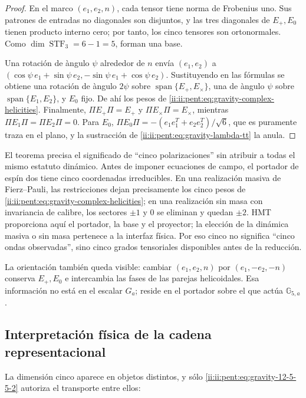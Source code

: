 \begin{proof}
En el marco \((e_1,e_2,n)\), cada tensor tiene norma de Frobenius uno.
Sus patrones de entradas no diagonales son disjuntos, y las tres diagonales
de \(E_+,E_0\) tienen producto interno cero; por tanto, los cinco tensores
son ortonormales. Como \(\dim\operatorname{STF}_3=6-1=5\), forman una base.

Una rotaci\'on de \`angulo \(\psi\) alrededor de \(n\) env\'ia
\((e_1,e_2)\) a
\((\cos\psi\,e_1+\sin\psi\,e_2,
-\sin\psi\,e_1+\cos\psi\,e_2)\). Sustituyendo en las f\'ormulas se obtiene
una rotaci\'on de \`angulo \(2\psi\) sobre
\(\operatorname{span}\{E_+,E_\times\}\), una de \`angulo \(\psi\) sobre
\(\operatorname{span}\{E_1,E_2\}\), y \(E_0\) fijo. De ah\'i los pesos de
\eqref{ii:ii:pent:eq:gravity-complex-helicities}. Finalmente,
\(\Pi E_{+}\Pi=E_+\) y \(\Pi E_\times\Pi=E_\times\), mientras
\(\Pi E_1\Pi=\Pi E_2\Pi=0\). Para \(E_0\),
\(\Pi E_0\Pi=-(e_1e_1^T+e_2e_2^T)/\sqrt6\), que es puramente traza en
el plano, y la sustracci\'on de \eqref{ii:ii:pent:eq:gravity-lambda-tt} la anula.
\end{proof}

El teorema precisa el significado de ``cinco polarizaciones'' sin atribuir
a todas el mismo estatuto din\'amico. Antes de imponer ecuaciones de campo,
el portador de esp\'in dos tiene cinco coordenadas irreducibles. En una
realizaci\'on masiva de Fierz--Pauli, las restricciones dejan precisamente
los cinco pesos de \eqref{ii:ii:pent:eq:gravity-complex-helicities}; en una realizaci\'on
sin masa con invariancia de calibre, los sectores \(\pm1\) y \(0\) se eliminan y
quedan \(\pm2\). HMT proporciona aqu\'i el portador, la base y el proyector;
la elecci\'on de la din\'amica masiva o sin masa pertenece a la interfaz
f\'isica. Por eso cinco no significa ``cinco ondas observadas'', sino cinco
grados tensoriales disponibles antes de la reducci\'on.

La orientaci\'on tambi\'en queda visible: cambiar
\((e_1,e_2,n)\) por \((e_1,-e_2,-n)\) conserva \(E_+,E_0\) e intercambia
las fases de las parejas helicoidales. Esa informaci\'on no est\'a en el
escalar \(G_a\); reside en el portador sobre el que act\'ua
\(\mathbb G_{5,a}\).

\subsection{Interpretación física de la cadena representacional}

La dimensi\'on cinco aparece en objetos distintos, y s\'olo
\eqref{ii:ii:pent:eq:gravity-12-5-5-2} autoriza el transporte entre ellos:

